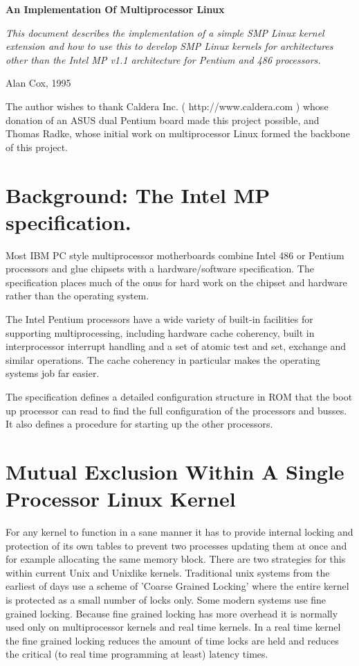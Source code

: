 \documentclass[]{article}
\begin{document}
\begin{center}
\LARGE \bf
An Implementation Of Multiprocessor Linux
\normalsize
\end{center}

{ \it
This document describes the implementation of a simple SMP 
Linux kernel extension and how to use this to develop SMP Linux kernels for 
architectures other than the Intel MP v1.1 architecture for Pentium and 486 
processors.}

\hfill Alan Cox, 1995


The author wishes to thank Caldera Inc. ( http://www.caldera.com )
whose donation of an ASUS dual Pentium board made this project possible, 
and Thomas Radke, whose initial work on multiprocessor Linux formed 
the backbone of this project.

\section{Background: The Intel MP specification.}
Most IBM PC style multiprocessor motherboards combine Intel 486 or Pentium 
processors and glue chipsets with a hardware/software specification. The 
specification places much of the onus for hard work on the chipset and 
hardware rather than the operating system.

The Intel Pentium processors have a wide variety of built-in facilities for 
supporting multiprocessing, including hardware cache coherency, built in 
interprocessor interrupt handling and a set of atomic test and set, 
exchange and similar operations. The cache coherency in particular makes the 
operating systems job far easier.

The specification defines a detailed configuration structure in ROM that 
the boot up processor can read to find the full configuration of the 
processors and busses. It also defines a procedure for starting up the 
other processors.


\section{Mutual Exclusion Within A Single Processor Linux Kernel}
For any kernel to function in a sane manner it has to provide internal 
locking and protection of its own tables to prevent two processes updating 
them at once and for example allocating the same memory block. There are 
two strategies for this within current Unix and Unixlike kernels. 
Traditional unix systems from the earliest of days use a scheme of 'Coarse 
Grained Locking' where the entire kernel is protected as a small number of 
locks only. Some modern systems use fine grained locking. Because fine 
grained locking has more overhead it is normally used only on 
multiprocessor kernels and real time kernels. In a real time kernel the 
fine grained locking reduces the amount of time locks are held and reduces 
the critical (to real time programming at least) latency times.
\end{document}

